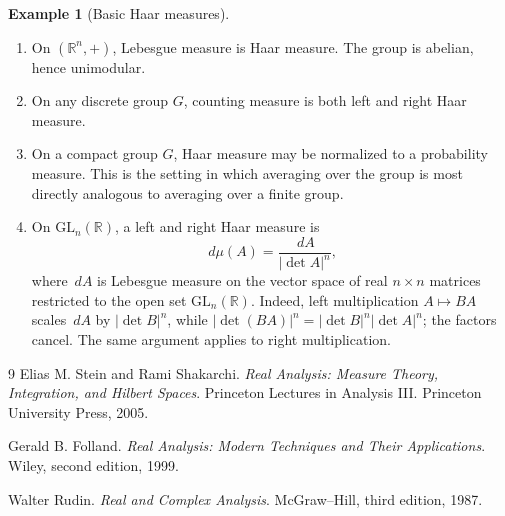 \documentclass[11pt,openany]{book}
\numberwithin{equation}{chapter}
\theoremstyle{definition}
\newtheorem{example}[definition]{Example}
\theoremstyle{plain}
\theoremstyle{remark}
\newcommand{\R}{\mathbb{R}}
\newcommand{\1}{\mathbf{1}}
\newcommand{\dd}{\,d}
\newcommand{\abs}[1]{\left\lvert #1\right\rvert}
\begin{document}
\begin{example}[Basic Haar measures]
\begin{enumerate}[label=\textup{(\roman*)}]
  \item On \((\R^n,+)\), Lebesgue measure is Haar measure. The group is abelian, hence unimodular.
  \item On any discrete group \(G\), counting measure is both left and right Haar measure.
  \item On a compact group \(G\), Haar measure may be normalized to a probability measure. This is the setting in which averaging over the group is most directly analogous to averaging over a finite group.
  \item On \(\mathrm{GL}_n(\R)\), a left and right Haar measure is
  \[
    \dd\mu(A)=\frac{\dd A}{\abs{\det A}^{n}},
  \]
  where \(\dd A\) is Lebesgue measure on the vector space of real \(n\times n\) matrices restricted to the open set \(\mathrm{GL}_n(\R)\). Indeed, left multiplication \(A\mapsto BA\) scales \(\dd A\) by \(\abs{\det B}^{n}\), while \(\abs{\det(BA)}^n=\abs{\det B}^{n}\abs{\det A}^{n}\); the factors cancel. The same argument applies to right multiplication.
\end{enumerate}
\end{example}


\begin{thebibliography}{9}
Elias M. Stein and Rami Shakarchi.
\newblock \emph{Real Analysis: Measure Theory, Integration, and Hilbert Spaces}.
\newblock Princeton Lectures in Analysis III. Princeton University Press, 2005.

Gerald B. Folland.
\newblock \emph{Real Analysis: Modern Techniques and Their Applications}.
\newblock Wiley, second edition, 1999.

Walter Rudin.
\newblock \emph{Real and Complex Analysis}.
\newblock McGraw--Hill, third edition, 1987.
\end{thebibliography}
\end{document}
